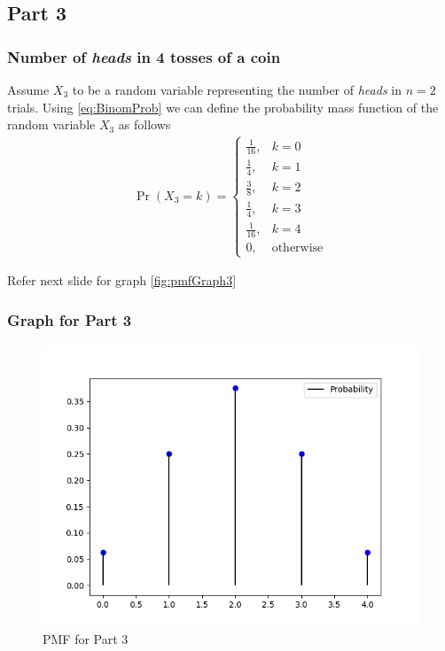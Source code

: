 \documentclass{beamer}
\begin{document}
\subsection{Part 3}
\begin{frame}
  \frametitle{Number of \emph{heads} in 4 tosses of a coin}
  Assume $X_3$ to be a random variable representing the number of \emph{heads} in $n = 2$ trials. Using
  \eqref{eq:BinomProb}
  we can define the probability mass function of the random variable $X_3$ as follows
  \begin{align}
    \Pr(X_3 = k) = 
    \begin{cases}
      \frac{1}{16}, & k = 0 \\
      \frac{1}{4}, & k = 1 \\
      \frac{3}{8}, & k = 2 \\
      \frac{1}{4}, & k = 3 \\
      \frac{1}{16}, & k = 4 \\
      0, & \text{otherwise}
    \end{cases}
    \label{eq:Pmf3}
  \end{align}

  Refer next slide for graph
  \eqref{fig:pmfGraph3}
\end{frame}

\begin{frame}
  \frametitle{Graph for Part 3}
  \begin{figure}[!ht]
    \centering
    \includegraphics[width=0.5\columnwidth]{../Figures/coin3.png}
    \caption{PMF for Part 3}
    \label{fig:pmfGraph3}
  \end{figure}
\end{frame}
\end{document}
